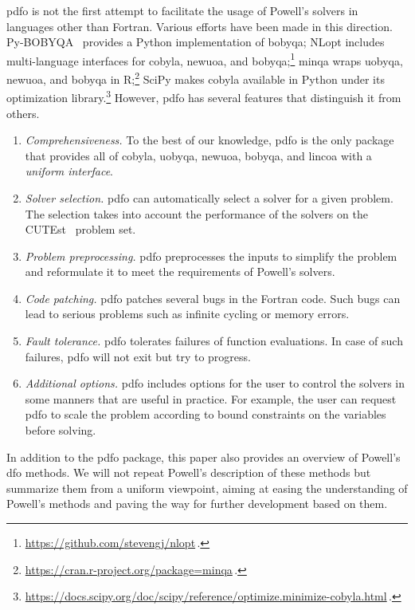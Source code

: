 \documentclass[smallextended,final]{svjour3}
\begin{document}
\Gls{pdfo} is not the first attempt to facilitate the usage of Powell's solvers in languages other than Fortran.
Various efforts have been made in this direction.
Py-BOBYQA~\cite{Cartis_Etal_2019,Cartis_Roberts_Sheridan-Methven_2022} provides a Python implementation of \gls{bobyqa}; NLopt includes multi-language interfaces for \gls{cobyla}, \gls{newuoa}, and \gls{bobyqa};\footnote{\url{https://github.com/stevengj/nlopt}\,.} minqa wraps \gls{uobyqa}, \gls{newuoa}, and \gls{bobyqa} in R;\footnote{\url{https://cran.r-project.org/package=minqa}\,.} SciPy makes \gls{cobyla} available in Python under its optimization library.\footnote{\url{https://docs.scipy.org/doc/scipy/reference/optimize.minimize-cobyla.html}\,.}
However, \gls{pdfo} has several features that distinguish it from others.
\begin{enumerate}
    \item \emph{Comprehensiveness.}
        To the best of our knowledge, \gls{pdfo} is the only package that provides all of \gls{cobyla}, \gls{uobyqa}, \gls{newuoa}, \gls{bobyqa}, and \gls{lincoa} with a \emph{uniform interface}.
    \item \emph{Solver selection.}
        \Gls{pdfo} can automatically select a solver for a given problem.
        The selection takes into account the performance of the solvers on the CUTEst~\cite{Gould_Orban_Toint_2015} problem set.
    \item \emph{Problem preprocessing.}
        \Gls{pdfo} preprocesses the inputs to simplify the problem and reformulate it to meet the requirements of Powell's solvers.
    \item \emph{Code patching.}
        \Gls{pdfo} patches several bugs in the Fortran code.
        Such bugs can lead to serious problems such as infinite cycling or memory errors.
    \item \emph{Fault tolerance.}
        \Gls{pdfo} tolerates failures of function evaluations.
        In case of such failures, \gls{pdfo} will not exit but try to progress.
    \item \emph{Additional options.}
        \gls{pdfo} includes options for the user to control the solvers in some manners that are useful in practice.
        For example, the user can request \gls{pdfo} to scale the problem according to bound constraints on the variables before solving.
\end{enumerate}

In addition to the \gls{pdfo} package, this paper also provides an overview of Powell's \gls{dfo} methods.
We will not repeat Powell's description of these methods but summarize them from a uniform viewpoint, aiming at easing the understanding of Powell's methods and paving the way for further development based on them.
\end{document}
